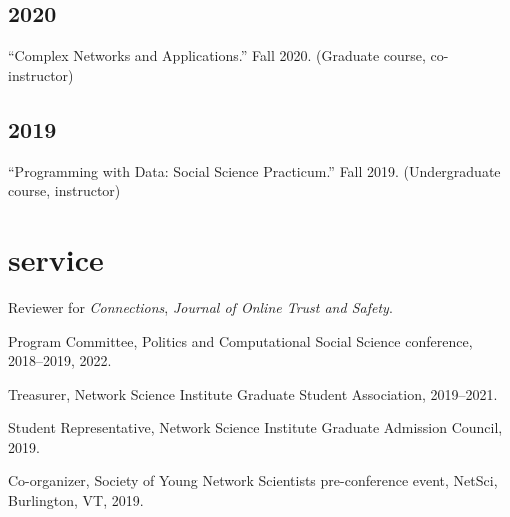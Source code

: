 \documentclass[11pt, letter]{article}
\begin{document}
\subsection{2020}
\begin{hangparas}{.25in}{1}
``Complex Networks and Applications.'' Fall 2020. (Graduate course,
co-instructor)
\end{hangparas}
\vspace{1mm}

\subsection{2019}
\begin{hangparas}{.25in}{1}
``Programming with Data: Social Science Practicum.'' Fall 2019.
(Undergraduate course, instructor) \vspace{2mm}
\end{hangparas}


 \section{service}
 Reviewer for \textit{Connections}, \textit{Journal of Online Trust and Safety}.

 Program Committee, Politics and Computational Social Science conference,
 2018--2019, 2022.

 Treasurer, Network Science Institute Graduate Student Association, 2019--2021.

 Student Representative, Network Science Institute Graduate Admission Council,
 2019.

 Co-organizer, Society of Young Network Scientists pre-conference event, NetSci,
 Burlington, VT, 2019.
\end{document}
